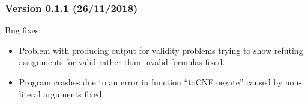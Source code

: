 \documentclass[twoside]{article}
\begin{document}
\subsubsection*{Version 0.1.1 (26/11/2018)}

Bug fixes:
\begin{itemize}
\item Problem with producing output for validity problems trying to show refuting assignments for valid rather than invalid formulas fixed. 
\item Program crashes due to an error in function ``toCNF.negate'' caused by non-literal arguments fixed. 
\end{itemize}

 

 
\end{document}
